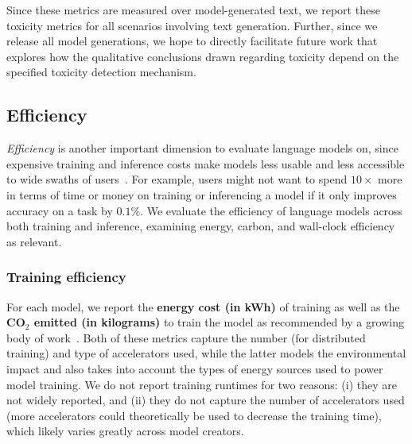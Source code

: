 Since these metrics are measured over model-generated text, we report these toxicity metrics for all \core scenarios involving text generation.
Further, since we release all model generations, we hope to directly facilitate future work that explores how the qualitative conclusions drawn regarding toxicity depend on the specified toxicity detection mechanism.

\hypertarget{efficiency}{\subsection{Efficiency}}
\label{sec:metrics-efficiency}

\emph{Efficiency} is another important dimension to evaluate language models on, since expensive training and inference costs make models less usable and less accessible to wide swaths of users~\citep[][\S5.3]{schwartz2020green,bender2021dangers,henderson2020towards,kaack2021aligning,strubell2019energy,lacoste2019quantifying,bommasani2021opportunities}.
For example, users might not want to spend $10\times$ more in terms of time or money on training or inferencing a model if it only improves accuracy on a task by $0.1\%$.
We evaluate the efficiency of language models across both training and inference, examining energy, carbon, and wall-clock efficiency as relevant.

\hypertarget{training-efficiency}{\subsubsection{Training efficiency}}
For each model, we report the \textbf{energy cost (in kWh)} of training as well as the \textbf{CO$_2$ emitted (in kilograms)} to train the model as recommended by a growing body of work~\citep[][\S5.3]{strubell2019energy,lacoste2019quantifying,anthony2020carbontracker,henderson2020towards,bender2021dangers,bommasani2021opportunities}. 
Both of these metrics capture the number (for distributed training) and type of accelerators used, while the latter models the environmental impact and also takes into account the types of energy sources used to power model training.
We do not report training runtimes for two reasons: (i) they are not widely reported, and (ii) they do not capture the number of accelerators used (\ie more accelerators could theoretically be used to decrease the training time), which likely varies greatly across model creators.

